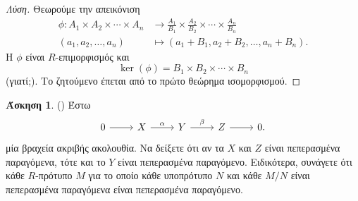 \documentclass[12pt,a4paper,reqno]{amsart}
\theoremstyle{definition}
\newtheorem{exercise}{Άσκηση}
\renewcommand{\to}{\rightarrow}
\begin{document}
\begin{proof}[Λύση]
  Θεωρούμε την απεικόνιση 
  \begin{align*}
    \phi : A_1 \times A_2 \times \cdots \times A_n &\to \frac{A_1}{B_1} \times \frac{A_2}{B_2} \times \cdots \times \frac{A_n}{B_n} \\
    (a_1, a_2, \dots, a_n) &\mapsto (a_1 + B_1, a_2 + B_2, \dots, a_n + B_n).
  \end{align*}
  Η $\phi$ είναι $R$-επιμορφισμός και 
  \[
  \ker(\phi) = B_1 \times B_2 \times \cdots \times B_n
  \]
  (γιατί;). Το ζητούμενο έπεται από το πρώτο θεώρημα ισομορφισμού.
\end{proof}

\begin{exercise}{\rm(\cite[Άσκηση~10.3.7]{DF04})}
  \label{ex:DF_10.3.7}
  Έστω
  \begin{equation}
    \label{eq:DF_10.3.7}
    \begin{tikzcd}
        0 \arrow[r] & X \arrow[r, "\alpha"] & Y \arrow[r, "\beta"] & Z \arrow[r] & 0.
    \end{tikzcd}
  \end{equation}
  μία βραχεία ακριβής ακολουθία. Να δείξετε ότι αν τα $X$ και $Z$ είναι πεπερασμένα παραγόμενα, τότε και το $Y$ είναι πεπερασμένα παραγόμενο. Ειδικότερα, συνάγετε ότι κάθε $R$-πρότυπο $M$ για το οποίο κάθε υποπρότυπο $N$ και κάθε $M/N$ είναι πεπερασμένα παραγόμενα είναι πεπερασμένα παραγόμενο.
\end{exercise}
\end{document}
